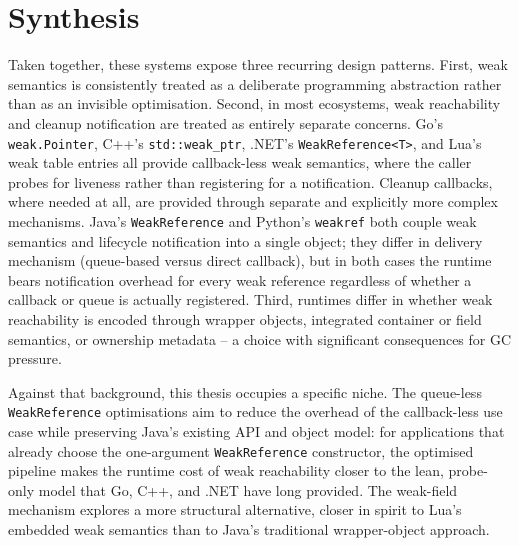 \section{Synthesis}
\label{sec:rw-synthesis}

Taken together, these systems expose three recurring design patterns. First, weak semantics is consistently treated as a deliberate programming abstraction rather than as an invisible optimisation. Second, in most ecosystems, weak reachability and cleanup notification are treated as entirely separate concerns. Go's \texttt{weak.Pointer}, C++'s \texttt{std::weak\_ptr}, .NET's \texttt{WeakReference<T>}, and Lua's weak table entries all provide callback-less weak semantics, where the caller probes for liveness rather than registering for a notification. Cleanup callbacks, where needed at all, are provided through separate and explicitly more complex mechanisms. Java's \texttt{WeakReference} and Python's \texttt{weakref} both couple weak semantics and lifecycle notification into a single object; they differ in delivery mechanism (queue-based versus direct callback), but in both cases the runtime bears notification overhead for every weak reference regardless of whether a callback or queue is actually registered. Third, runtimes differ in whether weak reachability is encoded through wrapper objects, integrated container or field semantics, or ownership metadata -- a choice with significant consequences for \ac{GC} pressure.

Against that background, this thesis occupies a specific niche. The queue-less \texttt{WeakReference} optimisations aim to reduce the overhead of the callback-less use case while preserving Java's existing \ac{API} and object model: for applications that already choose the one-argument \texttt{WeakReference} constructor, the optimised pipeline makes the runtime cost of weak reachability closer to the lean, probe-only model that Go, C++, and .NET have long provided. The weak-field mechanism explores a more structural alternative, closer in spirit to Lua's embedded weak semantics than to Java's traditional wrapper-object approach.
